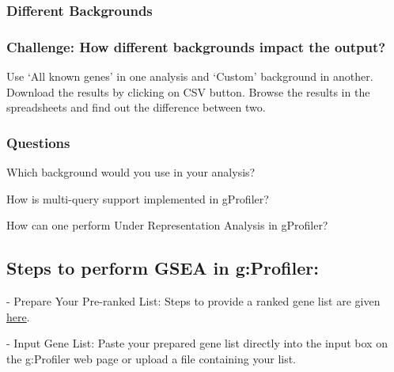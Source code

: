 \documentclass[
]{book}
\begin{document}
\hypertarget{section-3}{%
\subsubsection*{}\label{section-3}}

\hypertarget{different-backgrounds}{%
\subsubsection{Different Backgrounds}\label{different-backgrounds}}

\hypertarget{challenge-how-different-backgrounds-impact-the-output}{%
\subsubsection*{\texorpdfstring{\textbf{Challenge:} How different backgrounds impact the output?}{Challenge: How different backgrounds impact the output?}}\label{challenge-how-different-backgrounds-impact-the-output}}

Use `All known genes' in one analysis and `Custom' background in another. Download the results by clicking on CSV button. Browse the results in the spreadsheets and find out the difference between two.

\hypertarget{questions-1}{%
\subsubsection*{\texorpdfstring{\textbf{Questions }}{Questions }}\label{questions-1}}

Which background would you use in your analysis?

How is multi-query support implemented in gProfiler?

How can one perform Under Representation Analysis in gProfiler?

\hypertarget{steps-to-perform-gsea-in-gprofiler}{%
\subsection{Steps to perform GSEA in g:Profiler:}\label{steps-to-perform-gsea-in-gprofiler}}

{- Prepare Your Pre-ranked List:} Steps to provide a ranked gene list are given \href{degust.html}{here}.

{- Input Gene List:} Paste your prepared gene list directly into the input box on the g:Profiler web page or upload a file containing your list.
\end{document}
